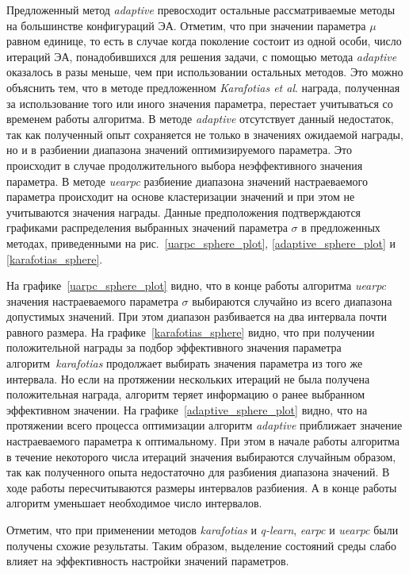 Предложенный метод \textit{adaptive} превосходит остальные рассматриваемые методы на большинстве конфигураций ЭА. Отметим, что при значении параметра $\mu$ равном единице, то есть в случае когда поколение состоит из одной особи, число итераций ЭА, понадобившихся для решения задачи, с помощью метода \textit{adaptive} оказалось в разы меньше, чем при использовании остальных методов. Это можно объяснить тем, что в методе предложенном \textit{Karafotias et al}. награда, полученная за использование того или иного значения параметра, перестает учитываться со временем работы алгоритма. В методе \textit{adaptive} отсутствует данный недостаток, так как полученный опыт сохраняется не только в значениях ожидаемой награды, но и в разбиении диапазона значений оптимизируемого параметра. Это происходит в случае продолжительного выбора неэффективного значения параметра. В методе \textit{uearpc} разбиение диапазона значений настраеваемого параметра происходит на основе кластеризации значений и при этом не учитываются значения награды. Данные предположения подтверждаются графиками распределения выбранных значений параметра $\sigma$ в предложенных методах, приведенными на рис.~\ref{uarpc_sphere_plot}, \ref{adaptive_sphere_plot} и \ref{karafotias_sphere}.

На графике~\ref{uarpc_sphere_plot} видно, что в конце работы алгоритма \textit{uearpc} значения настраеваемого параметра $\sigma$ выбираются случайно из всего диапазона допустимых значений. При этом диапазон разбивается на два интервала почти равного размера. На графике~\ref{karafotias_sphere} видно, что при получении положительной награды за подбор эффективного значения параметра алгоритм~\textit{karafotias} продолжает выбирать значения параметра из того же интервала. Но если на протяжении нескольких итераций не была получена положительная награда, алгоритм теряет информацию о ранее выбранном эффективном значении. На графике~\ref{adaptive_sphere_plot} видно, что на протяжении всего процесса оптимизации алгоритм \textit{adaptive} приближает значение настраеваемого параметра к оптимальному. При этом в начале работы алгоритма в течение некоторого числа итераций значения выбираются случайным образом, так как полученного опыта недостаточно для разбиения диапазона значений. В ходе работы пересчитываются размеры интервалов разбиения. А в конце работы алгоритм уменьшает необходимое число интервалов.

Отметим, что при применении методов \textit{karafotias} и \textit{q-learn}, \textit{earpc} и \textit{uearpc} были получены схожие результаты. Таким образом, выделение состояний среды слабо влияет на эффективность настройки значений параметров.

